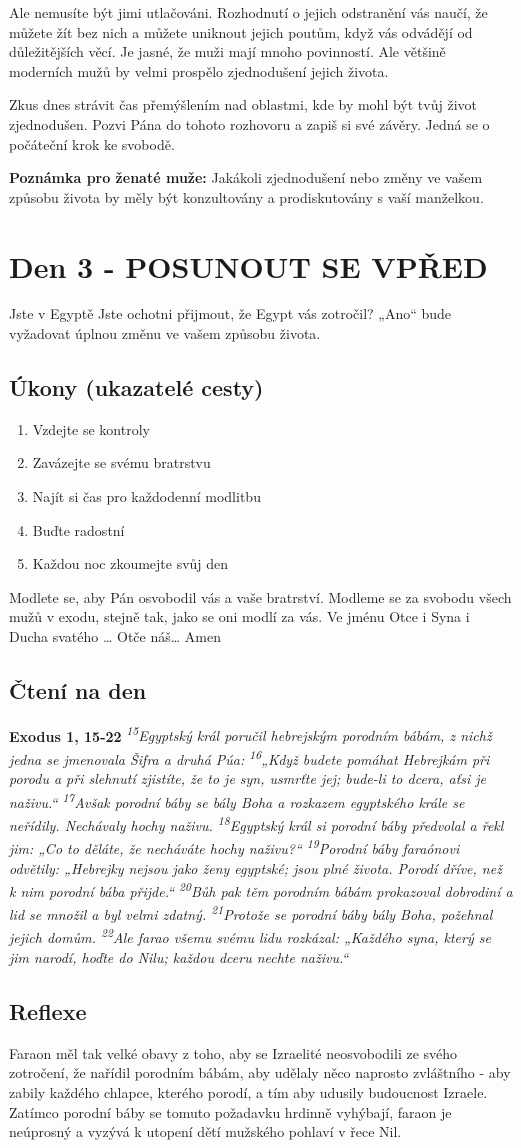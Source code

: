 \documentclass[11pt]{article}
\newcommand{\zacatekPrvniTyden}{
  Jste v Egyptě \newline
  Jste ochotni přijmout, že Egypt vás zotročil? „Ano“ bude vyžadovat úplnou změnu ve vašem způsobu života.

\subsection*{Úkony (ukazatelé cesty)}
\begin{enumerate}
  \item Vzdejte se kontroly
  \item Zavázejte se svému bratrstvu
  \item Najít si čas pro každodenní modlitbu
  \item Buďte radostní
  \item Každou noc zkoumejte svůj den
\end{enumerate}
Modlete se, aby Pán osvobodil vás a vaše bratrství. \newline
Modleme se za svobodu všech mužů v exodu, stejně tak, jako se oni modlí za vás.\newline
Ve jménu Otce i Syna i Ducha svatého …  Otče náš… Amen
}
\begin{document}
Ale nemusíte být jimi utlačováni. Rozhodnutí o jejich odstranění vás naučí, že můžete žít bez nich a můžete uniknout jejich poutům, když vás odvádějí od důležitějších věcí.
Je jasné, že muži mají mnoho povinností. Ale většině moderních mužů by velmi prospělo zjednodušení jejich života.

Zkus dnes strávit čas přemýšlením nad oblastmi, kde by mohl být tvůj život zjednodušen. Pozvi Pána do tohoto rozhovoru a zapiš si své závěry. Jedná se o počáteční krok ke svobodě.

\textbf{Poznámka pro ženaté muže:} Jakákoli zjednodušení nebo změny ve vašem způsobu života by měly být konzultovány a prodiskutovány s vaší manželkou.

\newpage
\section{Den 3 - POSUNOUT SE VPŘED}
\zacatekPrvniTyden
\subsection*{Čtení na den}
\textbf{Exodus 1, 15-22}
\newline
\textit{
\textsuperscript{15}Egyptský král poručil hebrejským porodním bábám, z nichž jedna se jmenovala Šifra a druhá Púa:
\textsuperscript{16}„Když budete pomáhat Hebrejkám při porodu a při slehnutí zjistíte, že to je syn, usmrťte jej; bude-li to dcera, aťsi je naživu.“
\textsuperscript{17}Avšak porodní báby se bály Boha a rozkazem egyptského krále se neřídily. Nechávaly hochy naživu.
\textsuperscript{18}Egyptský král si porodní báby předvolal a řekl jim: „Co to děláte, že necháváte hochy naživu?“
\textsuperscript{19}Porodní báby faraónovi odvětily: „Hebrejky nejsou jako ženy egyptské; jsou plné života. Porodí dříve, než k nim porodní bába přijde.“
\textsuperscript{20}Bůh pak těm porodním bábám prokazoval dobrodiní a lid se množil a byl velmi zdatný.
\textsuperscript{21}Protože se porodní báby bály Boha, požehnal jejich domům.
\textsuperscript{22}Ale farao všemu svému lidu rozkázal: „Každého syna, který se jim narodí, hoďte do Nilu; každou dceru nechte naživu.“
}

\subsection*{Reflexe}

Faraon měl tak velké obavy z toho, aby se Izraelité neosvobodili ze svého zotročení, že nařídil porodním bábám, aby udělaly něco naprosto zvláštního - aby zabily každého chlapce, kterého porodí, a tím aby udusily budoucnost Izraele. Zatímco porodní báby se tomuto požadavku hrdinně vyhýbají, faraon je neúprosný a vyzývá k utopení dětí mužského pohlaví v řece Nil.
\end{document}
